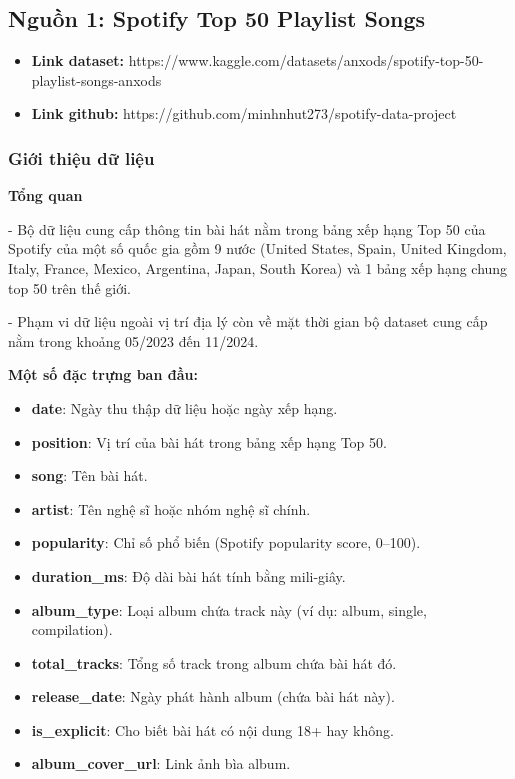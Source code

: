 
\subsection{Nguồn 1: Spotify Top 50 Playlist Songs }

\begin{itemize}
    \item     \textbf{Link dataset: }https://www.kaggle.com/datasets/anxods/spotify-top-50-playlist-songs-anxods
    \item     \textbf{Link github: }https://github.com/minhnhut273/spotify-data-project
\end{itemize}

\subsubsection{Giới thiệu dữ liệu}
  \textbf{Tổng quan} 


    - Bộ dữ liệu cung cấp thông tin bài hát nằm trong bảng xếp hạng Top 50 của Spotify của một số quốc gia gồm 9 nước (United States, Spain, United Kingdom, Italy, France, Mexico, Argentina, Japan, South Korea) và 1 bảng xếp hạng chung top 50 trên thế giới.

  
    - Phạm vi dữ liệu ngoài vị trí địa lý còn về mặt thời gian bộ dataset cung cấp nằm trong khoảng 05/2023 đến 11/2024.

   \textbf{Một số đặc trựng ban đầu:}

\begin{itemize}
    \item \textbf{date}: Ngày thu thập dữ liệu hoặc ngày xếp hạng. 


    \item \textbf{position}: Vị trí của bài hát trong bảng xếp hạng Top 50. 


    \item \textbf{song}: Tên bài hát. 


    \item \textbf{artist}: Tên nghệ sĩ hoặc nhóm nghệ sĩ chính. 


    \item \textbf{popularity}: Chỉ số phổ biến (Spotify popularity score, 0–100). 


    \item \textbf{duration\_ms}: Độ dài bài hát tính bằng mili-giây. 


    \item \textbf{album\_type}: Loại album chứa track này (ví dụ: album, single, compilation). 


    \item \textbf{total\_tracks}: Tổng số track trong album chứa bài hát đó. 


    \item \textbf{release\_date}: Ngày phát hành album (chứa bài hát này).

    \item \textbf{is\_explicit}: Cho biết bài hát có nội dung 18+ hay không. 
   

    \item \textbf{album\_cover\_url}: Link ảnh bìa album.
\end{itemize}

